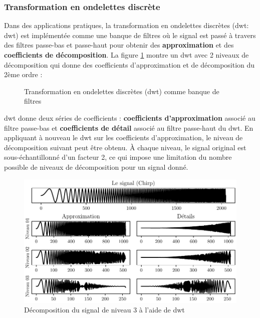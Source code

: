 \subsubsection{Transformation en ondelettes discrète}%
\label{subsub:transformation_en_ondelettes_discretes}

Dans des applications pratiques, la transformation en ondelettes discrètes (\acrlong{dwt}: \acrshort{dwt}) est implémentée comme une banque de filtres où le signal est passé à travers des filtres passe-bas et passe-haut pour obtenir des \textbf{approximation} et des \textbf{coefficients de décomposition}. La figure \ref{fig:dwt} montre un \acrshort{dwt} avec 2 niveaux de décomposition qui donne des coefficients d'approximation et de décomposition du 2ème ordre :

\begin{figure}[H]
    \centering
    
    \caption{Transformation en ondelettes discrètes (\acrshort{dwt}) comme banque de filtres}
    \label{fig:dwt}
\end{figure}

\acrshort{dwt} donne deux séries de coefficients : \textbf{coefficients d'approximation} associé au filtre passe-bas et \textbf{coefficients de détail} associé au filtre passe-haut du \acrshort{dwt}. En appliquant à nouveau le \acrshort{dwt} sur les coefficients d'approximation, le niveau de décomposition suivant peut être obtenu. À chaque niveau, le signal original est sous-échantillonné d'un facteur 2, ce qui impose une limitation du nombre possible de niveaux de décomposition pour un signal donné.

\begin{figure}[h]
    \centering
    \includegraphics{figures/dwt_chirp_fr.pdf}
    \caption{Décomposition du signal de niveau 3 à l'aide de \acrshort{dwt}}
    \label{fig:dwt-chirp-signal}
\end{figure}



